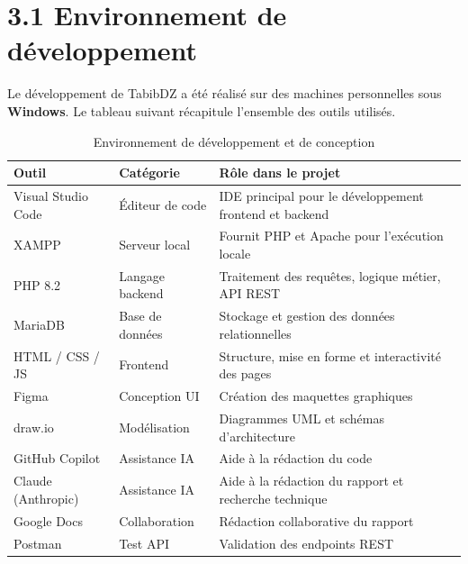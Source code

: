 \documentclass[12pt,a4paper]{report}
\begin{document}
\section*{3.1 Environnement de d\'eveloppement}

Le d\'eveloppement de TabibDZ a \'et\'e r\'ealis\'e sur des machines personnelles sous \textbf{Windows}. Le tableau suivant r\'ecapitule l'ensemble des outils utilis\'es.

\begin{table}[H]
\centering
\renewcommand{\arraystretch}{1.3}
\caption{Environnement de d\'eveloppement et de conception}
\begin{tabularx}{\textwidth}{|l|l|X|}
\hline
\textbf{Outil} & \textbf{Cat\'egorie} & \textbf{R\^ole dans le projet} \\
\hline
Visual Studio Code & \'Editeur de code    & IDE principal pour le d\'eveloppement frontend et backend \\
\hline
XAMPP              & Serveur local        & Fournit PHP et Apache pour l'ex\'ecution locale \\
\hline
PHP 8.2            & Langage backend      & Traitement des requ\^etes, logique m\'etier, API REST \\
\hline
MariaDB            & Base de donn\'ees   & Stockage et gestion des donn\'ees relationnelles \\
\hline
HTML / CSS / JS    & Frontend             & Structure, mise en forme et interactivit\'e des pages \\
\hline
Figma              & Conception UI        & Cr\'eation des maquettes graphiques \\
\hline
draw.io            & Mod\'elisation       & Diagrammes UML et sch\'emas d'architecture \\
\hline
GitHub Copilot     & Assistance IA        & Aide \`a la r\'edaction du code \\
\hline
Claude (Anthropic) & Assistance IA        & Aide \`a la r\'edaction du rapport et recherche technique \\
\hline
Google Docs        & Collaboration        & R\'edaction collaborative du rapport \\
\hline
Postman            & Test API             & Validation des endpoints REST \\
\hline
\end{tabularx}
\end{table}
\end{document}
